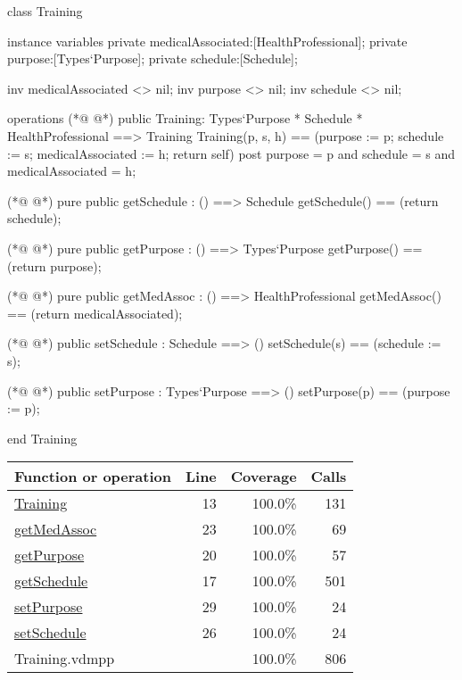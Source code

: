 \begin{vdmpp}[breaklines=true]
class Training
 
instance variables
 private medicalAssociated:[HealthProfessional];
 private purpose:[Types`Purpose];
 private schedule:[Schedule];

 inv medicalAssociated <> nil;
 inv purpose <> nil;
 inv schedule <> nil;

operations
(*@
\label{Training:13}
@*)
 public Training: Types`Purpose * Schedule * HealthProfessional ==> Training
   Training(p, s, h) == (purpose := p; schedule := s; medicalAssociated := h; return self)
 post purpose = p and schedule = s and medicalAssociated = h;

(*@
\label{getSchedule:17}
@*)
 pure public getSchedule : () ==> Schedule
   getSchedule() == (return schedule);
 
(*@
\label{getPurpose:20}
@*)
  pure public getPurpose : () ==> Types`Purpose
  getPurpose() == (return purpose); 
 
(*@
\label{getMedAssoc:23}
@*)
 pure public getMedAssoc : () ==> HealthProfessional
  getMedAssoc() == (return medicalAssociated); 

(*@
\label{setSchedule:26}
@*)
 public setSchedule : Schedule ==> ()
   setSchedule(s) == (schedule := s);
 
(*@
\label{setPurpose:29}
@*)
 public setPurpose : Types`Purpose ==> ()
   setPurpose(p) == (purpose := p);
 
 end Training
\end{vdmpp}
\bigskip
\begin{longtable}{|l|r|r|r|}
\hline
Function or operation & Line & Coverage & Calls \\
\hline
\hline
\hyperref[Training:13]{Training} & 13&100.0\% & 131 \\
\hline
\hyperref[getMedAssoc:23]{getMedAssoc} & 23&100.0\% & 69 \\
\hline
\hyperref[getPurpose:20]{getPurpose} & 20&100.0\% & 57 \\
\hline
\hyperref[getSchedule:17]{getSchedule} & 17&100.0\% & 501 \\
\hline
\hyperref[setPurpose:29]{setPurpose} & 29&100.0\% & 24 \\
\hline
\hyperref[setSchedule:26]{setSchedule} & 26&100.0\% & 24 \\
\hline
\hline
Training.vdmpp & & 100.0\% & 806 \\
\hline
\end{longtable}

